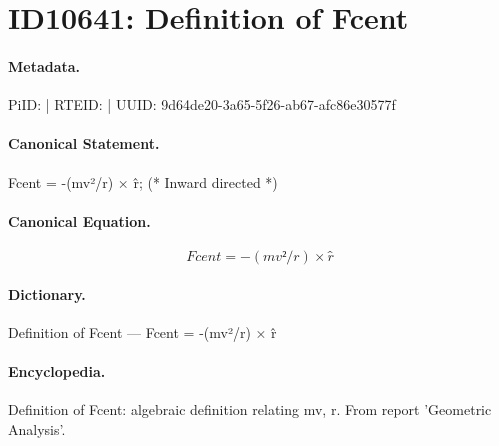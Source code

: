 \section*{ID10641: Definition of Fcent}
\paragraph{Metadata.}
PiID:  | RTEID:  | UUID: 9d64de20-3a65-5f26-ab67-afc86e30577f

\paragraph{Canonical Statement.}
Fcent = -(mv²/r) × r̂; (* Inward directed *)

\paragraph{Canonical Equation.}
\[
Fcent = -(mv²/r) × r̂
\]

\paragraph{Dictionary.}
Definition of Fcent — Fcent = -(mv²/r) × r̂

\paragraph{Encyclopedia.}
Definition of Fcent: algebraic definition relating mv, r. From report 'Geometric Analysis'.
